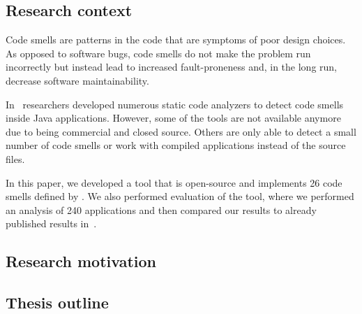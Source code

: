 \subsection{Research context}\label{subsec:research-context}

Code smells are patterns in the code that are symptoms of poor design choices.
As opposed to software bugs, code smells do not make the problem run incorrectly but
instead lead to increased fault-proneness and, in the long run, decrease software maintainability.

In~\cite{mannan2016understanding, sonar-plugin-external, paprika-paper} researchers developed
numerous static code analyzers to detect code smells inside Java applications.
However, some of the tools are not available anymore due to being commercial and closed source.
Others are only able to detect a small number of code smells or work with compiled applications instead
of the source files.

In this paper, we developed a tool that is open-source and implements 26 code smells defined by \citeauthor{refactoring-fowler}.
We also performed evaluation of the tool, where we performed an analysis of 240 applications and then
compared our results to already published results in~\cite{mannan2016understanding}.

\subsection{Research motivation}\label{subsec:research-motivation}


\subsection{Thesis outline}\label{subsec:thesis-outline}

